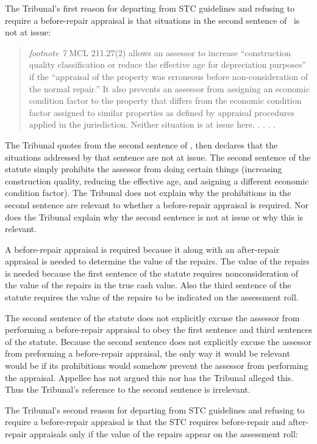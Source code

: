 \documentclass[12pt,\documentclassflag]{michiganCourtOfAppealsBrief}
\begin{document}
The Tribunal's first reason for departing from STC guidelines and refusing to require a before-repair appraisal is that situations in the second sentence of \mathieuGast\ is not at issue:

\begin{quote}
  {\em footnote 7} MCL 211.27(2) allows an assessor to increase ``construction quality classification or reduce the effective age for depreciation purposes'' if the ``appraisal of the property was erroneous before non-consideration of the normal repair.'' It also prevents an assessor from assigning an economic condition factor to the property that differs from the economic condition factor assigned to similar properties as defined by appraisal procedures applied in the jurisdiction. Neither situation is at issue here. . . . \reconsiderationDenied[2].
\end{quote}

The Tribunal quotes from the second sentence of \mathieuGast, then declares that the situations addressed by that sentence are not at issue. The second sentence of the statute simply prohibits the assessor from doing certain things (increasing construction quality, reducing the effective age, and asigning a different economic condition factor). The Tribunal does not explain why the prohibitions in the second sentence are relevant to whether a before-repair appraisal is required. Nor does the Tribunal explain why the second sentence is not at issue or why this is relevant.

A before-repair appraisal is required because it along with an after-repair appraisal is needed to determine the value of the repairs. The value of the repairs is needed because the first sentence of the statute requires nonconsideration of the value of the repairs in the true cash value. Also the third sentence of the statute requires the value of the repairs to be indicated on the assessment roll.

The second sentence of the statute does not explicitly excuse the assessor from performing a before-repair appraisal to obey the first sentence and third sentences of the statute.
Because the second sentence does not explicitly excuse the assessor from preforming a before-repair appraisal, the only way it would be relevant would be if its prohibitions would somehow prevent the assessor from performing the appraisal. Appellee has not argued this nor has the Tribunal alleged this.
Thus the Tribunal's reference to the second sentence is irrelevant.

The Tribunal's second reason for departing from STC guidelines and refusing to require a before-repair appraisal is that the STC requires before-repair and after-repair appraisals only if the value of the repairs appear on the assessment roll:
\end{document}
